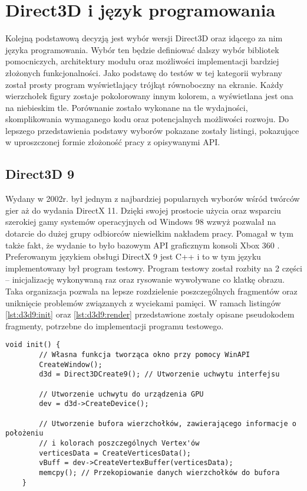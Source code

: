 \section{Direct3D i język programowania}

Kolejną podstawową decyzją jest wybór wersji Direct3D oraz idącego za
nim języka programowania. Wybór ten będzie definiować dalszy wybór
bibliotek pomocniczych, architektury modułu oraz możliwości
implementacji bardziej złożonych funkcjonalności. Jako podstawę do testów w tej kategorii wybrany został prosty program
wyświetlający trójkąt równoboczny na ekranie. Każdy wierzchołek figury
zostaje pokolorowany innym kolorem, a wyświetlana jest ona na niebieskim
tle. Porównanie zostało wykonane na tle wydajności, skomplikowania
wymaganego kodu oraz potencjalnych możliwości rozwoju. Do lepszego przedstawienia podstawy wyborów pokazane zostały listingi, pokazujące w uproszczonej formie złożoność pracy z opisywanymi API.

\subsection{Direct3D 9}

Wydany w 2002r. był jednym z najbardziej popularnych wyborów wśród
twórców gier aż do wydania DirectX 11. Dzięki swojej prostocie użycia
oraz wsparciu szerokiej gamy systemów operacyjnych od Windows 98 wzwyż
\cite{falconfly:dxredist:2024} pozwalał na dotarcie do dużej grupy odbiorców niewielkim
nakładem pracy. Pomagał w tym także fakt, że wydanie to było bazowym API
graficznym konsoli Xbox 360 \cite{ms:xbox360bp:2024}. Preferowanym językiem obsługi DirectX 9 jest C++ i to w tym języku
implementowany był program testowy. Program testowy został rozbity na 2 części -- inicjalizację wykonywaną
raz oraz rysowanie wywoływane co klatkę obrazu. Taka organizacja pozwala
na lepsze rozdzielenie poszczególnych fragmentów oraz uniknięcie
problemów związanych z wyciekami pamięci. W ramach listingów \ref{lst:d3d9:init} oraz \ref{lst:d3d9:render} przedstawione zostały opisane pseudokodem fragmenty, potrzebne do implementacji programu testowego.

\begin{lstlisting}[caption={Pseudokod inicjalizacji Direct3D 9}, label={lst:d3d9:init}]
	void init() {
		// Własna funkcja tworząca okno przy pomocy WinAPI
		CreateWindow();
		d3d = Direct3DCreate9(); // Utworzenie uchwytu interfejsu
		
		// Utworzenie uchwytu do urządzenia GPU
		dev = d3d->CreateDevice();
		
		// Utworzenie bufora wierzchołków, zawierającego informacje o położeniu 
		// i kolorach poszczególnych Vertex'ów
		verticesData = CreateVerticesData();
		vBuff = dev->CreateVertexBuffer(verticesData);
		memcpy(); // Przekopiowanie danych wierzchołków do bufora
	}
\end{lstlisting}

